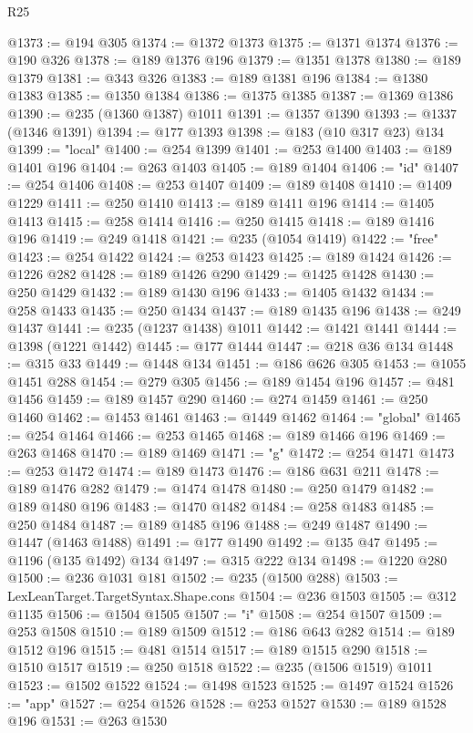 \begin{lexlean}{R25}
\begin{coremodule}
@1373 := @194 @305
@1374 := @1372 @1373
@1375 := @1371 @1374
@1376 := @190 @326
@1378 := @189 @1376 @196
@1379 := @1351 @1378
@1380 := @189 @1379
@1381 := @343 @326
@1383 := @189 @1381 @196
@1384 := @1380 @1383
@1385 := @1350 @1384
@1386 := @1375 @1385
@1387 := @1369 @1386
@1390 := @235 (@1360 @1387) @1011
@1391 := @1357 @1390
@1393 := @1337 (@1346 @1391)
@1394 := @177 @1393
@1398 := @183 (@10 @317 @23) @134
@1399 := "local"
@1400 := @254 @1399
@1401 := @253 @1400
@1403 := @189 @1401 @196
@1404 := @263 @1403
@1405 := @189 @1404
@1406 := "id"
@1407 := @254 @1406
@1408 := @253 @1407
@1409 := @189 @1408
@1410 := @1409 @1229
@1411 := @250 @1410
@1413 := @189 @1411 @196
@1414 := @1405 @1413
@1415 := @258 @1414
@1416 := @250 @1415
@1418 := @189 @1416 @196
@1419 := @249 @1418
@1421 := @235 (@1054 @1419)
@1422 := "free"
@1423 := @254 @1422
@1424 := @253 @1423
@1425 := @189 @1424
@1426 := @1226 @282
@1428 := @189 @1426 @290
@1429 := @1425 @1428
@1430 := @250 @1429
@1432 := @189 @1430 @196
@1433 := @1405 @1432
@1434 := @258 @1433
@1435 := @250 @1434
@1437 := @189 @1435 @196
@1438 := @249 @1437
@1441 := @235 (@1237 @1438) @1011
@1442 := @1421 @1441
@1444 := @1398 (@1221 @1442)
@1445 := @177 @1444
@1447 := @218 @36 @134
@1448 := @315 @33
@1449 := @1448 @134
@1451 := @186 @626 @305
@1453 := @1055 @1451 @288
@1454 := @279 @305
@1456 := @189 @1454 @196
@1457 := @481 @1456
@1459 := @189 @1457 @290
@1460 := @274 @1459
@1461 := @250 @1460
@1462 := @1453 @1461
@1463 := @1449 @1462
@1464 := "global"
@1465 := @254 @1464
@1466 := @253 @1465
@1468 := @189 @1466 @196
@1469 := @263 @1468
@1470 := @189 @1469
@1471 := "g"
@1472 := @254 @1471
@1473 := @253 @1472
@1474 := @189 @1473
@1476 := @186 @631 @211
@1478 := @189 @1476 @282
@1479 := @1474 @1478
@1480 := @250 @1479
@1482 := @189 @1480 @196
@1483 := @1470 @1482
@1484 := @258 @1483
@1485 := @250 @1484
@1487 := @189 @1485 @196
@1488 := @249 @1487
@1490 := @1447 (@1463 @1488)
@1491 := @177 @1490
@1492 := @135 @47
@1495 := @1196 (@135 @1492) @134
@1497 := @315 @222 @134
@1498 := @1220 @280
@1500 := @236 @1031 @181
@1502 := @235 (@1500 @288)
@1503 := LexLeanTarget.TargetSyntax.Shape.cons
@1504 := @236 @1503
@1505 := @312 @1135
@1506 := @1504 @1505
@1507 := "i"
@1508 := @254 @1507
@1509 := @253 @1508
@1510 := @189 @1509
@1512 := @186 @643 @282
@1514 := @189 @1512 @196
@1515 := @481 @1514
@1517 := @189 @1515 @290
@1518 := @1510 @1517
@1519 := @250 @1518
@1522 := @235 (@1506 @1519) @1011
@1523 := @1502 @1522
@1524 := @1498 @1523
@1525 := @1497 @1524
@1526 := "app"
@1527 := @254 @1526
@1528 := @253 @1527
@1530 := @189 @1528 @196
@1531 := @263 @1530

\end{coremodule}
\end{lexlean}
